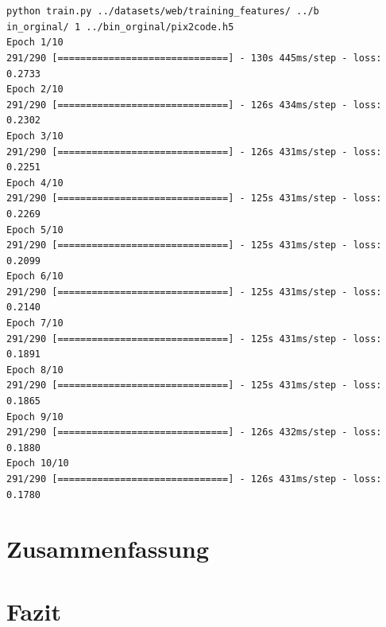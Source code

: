 \documentclass[pdftex,a4paper,halfparskip, article]{scrartcl}
\begin{document}
\begin{verbatim}


python train.py ../datasets/web/training_features/ ../b
in_orginal/ 1 ../bin_orginal/pix2code.h5 
Epoch 1/10
291/290 [==============================] - 130s 445ms/step - loss: 0.2733
Epoch 2/10
291/290 [==============================] - 126s 434ms/step - loss: 0.2302
Epoch 3/10
291/290 [==============================] - 126s 431ms/step - loss: 0.2251
Epoch 4/10
291/290 [==============================] - 125s 431ms/step - loss: 0.2269
Epoch 5/10
291/290 [==============================] - 125s 431ms/step - loss: 0.2099
Epoch 6/10
291/290 [==============================] - 125s 431ms/step - loss: 0.2140
Epoch 7/10
291/290 [==============================] - 125s 431ms/step - loss: 0.1891
Epoch 8/10
291/290 [==============================] - 125s 431ms/step - loss: 0.1865
Epoch 9/10
291/290 [==============================] - 126s 432ms/step - loss: 0.1880
Epoch 10/10
291/290 [==============================] - 126s 431ms/step - loss: 0.1780
\end{verbatim}
\section{Zusammenfassung}
\section{Fazit}


 
\end{document}
